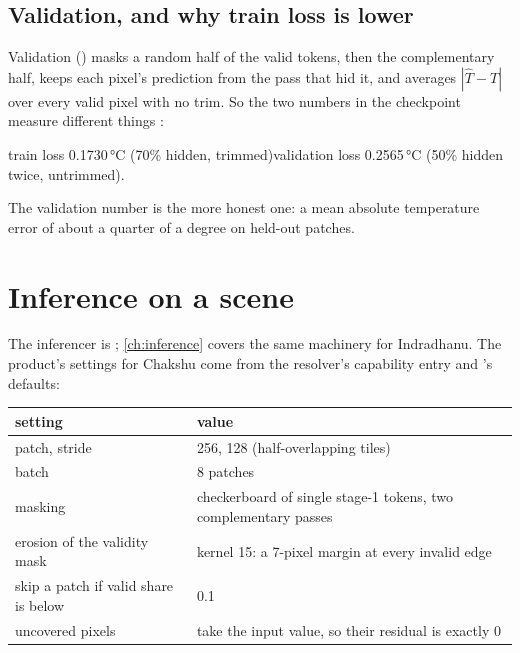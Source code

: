 \subsection{Validation, and why train loss is lower}

Validation () masks a random half of the valid tokens, then the complementary half,
keeps each pixel's prediction from the pass that hid it, and averages $|\hat T-T|$ over every valid pixel with no
trim. So the two numbers in the checkpoint measure different things :
\begin{center}
train loss 0.1730\,°C (70\% hidden, trimmed)\qquad validation loss 0.2565\,°C (50\% hidden twice, untrimmed).
\end{center}
The validation number is the more honest one: a mean absolute temperature error of about a quarter of a degree on
held-out patches.

\section{Inference on a scene}\label{sec:chakshu:infer}

The inferencer is ; \cref{ch:inference} covers the
same machinery for Indradhanu. The product's settings for Chakshu come from the resolver's capability entry and
's defaults:
\begin{center}\small
\begin{tabular}{@{}ll@{}}
\toprule
setting & value\\
\midrule
patch, stride & 256, 128 (half-overlapping tiles)\\
batch & 8 patches\\
masking & checkerboard of single stage-1 tokens, two complementary passes\\
erosion of the validity mask & kernel 15: a 7-pixel margin at every invalid edge\\
skip a patch if valid share is below & 0.1\\
uncovered pixels & take the input value, so their residual is exactly 0\\
\bottomrule
\end{tabular}
\end{center}

